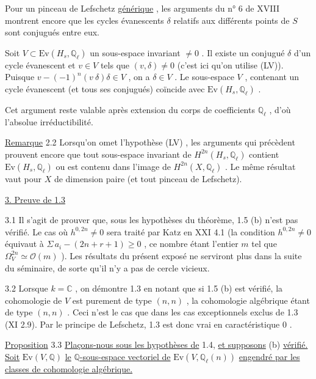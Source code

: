 Pour un pinceau de Lefschetz \underline{générique} , les arguments du n° 6 de XVIII montrent encore que les cycles évanescents $\delta$ relatifs aux différents points de $S$ sont conjugués entre eux.

Soit $V \subset \mathrm{Ev}(H_s, \mathbb{Q}_\ell)$ un sous-espace invariant $\neq 0$ . Il existe un conjugué $\delta$ d'un cycle évanescent et $v \in V$ tels que $(v, \delta) \neq 0$ (c'est ici qu'on utilise (LV)). Puisque $v - (-1)^n(v\ \delta)\delta \in V$ , on a $\delta \in V$ . Le sous-espace $V$ , contenant un cycle évanescent (et tous ses conjugués) coïncide avec $\mathrm{Ev}(H_s, \mathbb{Q}_\ell)$ .

Cet argument reste valable après extension du corps de coefficients $\mathbb{Q}_\ell$ , d'où l'absolue irréductibilité.

\underline{Remarque} 2.2 \quad Lorsqu'on omet l'hypothèse (LV) , les arguments qui précèdent prouvent encore que tout sous-espace invariant de $H^{2n}(H_s, \mathbb{Q}_\ell)$ contient $\mathrm{Ev}(H_s, \mathbb{Q}_\ell)$ ou est contenu dans l'image de $H^{2n}(X, \mathbb{Q}_\ell)$ . Le même résultat vaut pour $X$ de dimension paire (et tout pinceau de Lefschetz).


\underline{3. Preuve de 1.3}

3.1 \quad Il s'agit de prouver que, sous les hypothèses du théorème, 1.5 (b) n'est pas vérifié. Le cas où $h^{0,2n} \neq 0$ sera traité par Katz en XXI 4.1 (la condition $h^{0,2n} \neq 0$ équivaut à $\Sigma\, a_i - (2n + r + 1) \geq 0$ , ce nombre étant l'entier $m$ tel que $\Omega^{2n}_V \simeq \mathcal{O}(m)$ ). Les résultats du présent exposé ne serviront plus dans la suite du séminaire, de sorte qu'il n'y a pas de cercle vicieux.



3.2 \quad Lorsque $k = \mathbb{C}$ , on démontre 1.3 en notant que si 1.5 (b) est vérifié, la cohomologie de $V$ est purement de type $(n,n)$ , la cohomologie algébrique étant de type $(n,n)$ . Ceci n'est le cas que dans les cas exceptionnels exclus de 1.3 (XI 2.9). Par le principe de Lefschetz, 1.3 est donc vrai en caractéristique $0$ .

\underline{Proposition} 3.3 \quad \underline{Plaçons-nous sous les hypothèses de} 1.4, \underline{et supposons} (b) \underline{vérifié.} \underline{Soit} $\mathrm{Ev}(V, \mathbb{Q})$ \underline{le} $\mathbb{Q}$\underline{-sous-espace vectoriel de} $\mathrm{Ev}(V, \mathbb{Q}_\ell(n))$ \underline{engendré par les classes de cohomologie algébrique.}


